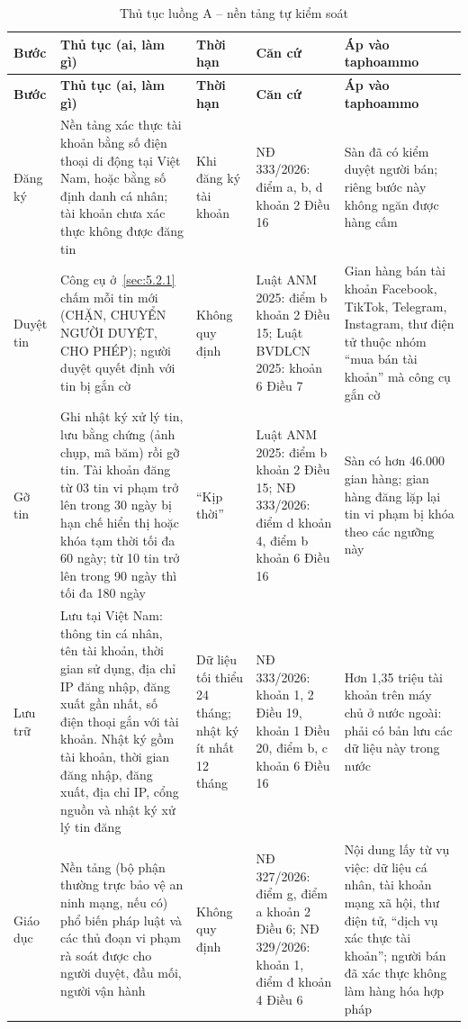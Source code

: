 {\small{}
\begin{xltabular}{\textwidth}{>{\raggedright\arraybackslash}l>{\hsize\raggedright\arraybackslash}X>{\hsize\raggedright\arraybackslash}X>{\hsize\raggedright\arraybackslash}X>{\hsize\raggedright\arraybackslash}X}
\caption{Thủ tục luồng A -- nền tảng tự kiểm soát}\label{tab:5.tt}\\
\toprule
\textbf{Bước} & \textbf{Thủ tục (ai, làm gì)} & \textbf{Thời hạn} & \textbf{Căn cứ} & \textbf{Áp vào taphoammo} \\
\midrule
\endfirsthead
\toprule
\textbf{Bước} & \textbf{Thủ tục (ai, làm gì)} & \textbf{Thời hạn} & \textbf{Căn cứ} & \textbf{Áp vào taphoammo} \\
\midrule
\endhead
\bottomrule
\endlastfoot
Đăng ký & Nền tảng xác thực tài khoản bằng số điện thoại di động tại Việt Nam, hoặc bằng số định danh cá nhân; tài khoản chưa xác thực không được đăng tin & Khi đăng ký tài khoản & NĐ 333/2026: điểm a, b, d khoản 2 Điều 16 & Sàn đã có kiểm duyệt người bán; riêng bước này không ngăn được hàng cấm \\
Duyệt tin & Công cụ ở~\ref{sec:5.2.1} chấm mỗi tin mới (CHẶN, CHUYỂN NGƯỜI DUYỆT, CHO PHÉP); người duyệt quyết định với tin bị gắn cờ & Không quy định & Luật ANM 2025: điểm b khoản 2 Điều 15; Luật BVDLCN 2025: khoản 6 Điều 7 & Gian hàng bán tài khoản Facebook, TikTok, Telegram, Instagram, thư điện tử thuộc nhóm “mua bán tài khoản” mà công cụ gắn cờ \\
Gỡ tin & Ghi nhật ký xử lý tin, lưu bằng chứng (ảnh chụp, mã băm) rồi gỡ tin. Tài khoản đăng từ 03 tin vi phạm trở lên trong 30 ngày bị hạn chế hiển thị hoặc khóa tạm thời tối đa 60 ngày; từ 10 tin trở lên trong 90 ngày thì tối đa 180 ngày & “Kịp thời” & Luật ANM 2025: điểm b khoản 2 Điều 15; NĐ 333/2026: điểm d khoản 4, điểm b khoản 6 Điều 16 & Sàn có hơn 46.000 gian hàng; gian hàng đăng lặp lại tin vi phạm bị khóa theo các ngưỡng này \\
Lưu trữ & Lưu tại Việt Nam: thông tin cá nhân, tên tài khoản, thời gian sử dụng, địa chỉ IP đăng nhập, đăng xuất gần nhất, số điện thoại gắn với tài khoản. Nhật ký gồm tài khoản, thời gian đăng nhập, đăng xuất, địa chỉ IP, cổng nguồn và nhật ký xử lý tin đăng & Dữ liệu tối thiểu 24 tháng; nhật ký ít nhất 12 tháng & NĐ 333/2026: khoản 1, 2 Điều 19, khoản 1 Điều 20, điểm b, c khoản 6 Điều 16 & Hơn 1,35 triệu tài khoản trên máy chủ ở nước ngoài: phải có bản lưu các dữ liệu này trong nước \\
Giáo dục & Nền tảng (bộ phận thường trực bảo vệ an ninh mạng, nếu có) phổ biến pháp luật và các thủ đoạn vi phạm rà soát được cho người duyệt, đầu mối, người vận hành & Không quy định & NĐ 327/2026: điểm g, điểm a khoản 2 Điều 6; NĐ 329/2026: khoản 1, điểm đ khoản 4 Điều 6 & Nội dung lấy từ vụ việc: dữ liệu cá nhân, tài khoản mạng xã hội, thư điện tử, “dịch vụ xác thực tài khoản”; người bán đã xác thực không làm hàng hóa hợp pháp \\
\end{xltabular}}

